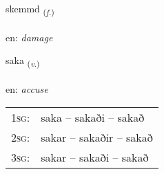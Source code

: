 \documentclass[frontgrid, backgrid]{flacards}\usepackage[]{graphicx}\usepackage[]{xcolor}
\begin{document}
\renewcommand{\flhead}{\vskip5pt \fboxsep=0pt {\small\bfseries\footnotesize Nafnorð | Noun}}
\renewcommand{\fcfoot}{\vskip5pt \fboxsep=0pt \hspace{2pt}{\small\bfseries\footnotesize 3K}}

\renewcommand{\blhead}{\vskip5pt {\small\bfseries\footnotesize Nafnorð | Noun }}
\renewcommand{\bcfoot}{\vskip5pt \hspace{2pt}{\small\bfseries\footnotesize 3K}}


{skemmd \small{\textsubscript{(\textit{f.})}} \\[1ex] %
\textphonetic{[scɛmt]} \\
en: \emph{damage} \\  [2ex]
\renewcommand*{\arraystretch}{0.8}
}

\renewcommand{\flhead}{\vskip5pt \fboxsep=0pt {\small\bfseries\footnotesize Sagnorð | Verb}}
\renewcommand{\fcfoot}{\vskip5pt \fboxsep=0pt \hspace{2pt}{\small\bfseries\footnotesize 3K}}

\renewcommand{\blhead}{\vskip5pt {\small\bfseries\footnotesize Sagnorð | Verb }}
\renewcommand{\bcfoot}{\vskip5pt \hspace{2pt}{\small\bfseries\footnotesize 3K}}


{saka \small{\textsubscript{(\textit{v.})}} \\[1ex] %
\textphonetic{[saːka]} \\
en: \emph{accuse} \\  [2ex]
\renewcommand*{\arraystretch}{0.8}
\begin{tabular}{p{1cm}l}
\textsc{1sg}: & saka -- sakaði -- sakað \\ 
\textsc{2sg}: & sakar -- sakaðir -- sakað \\ 
\textsc{3sg}: & sakar -- sakaði -- sakað \\ 
\end{tabular}
}
\end{document}
